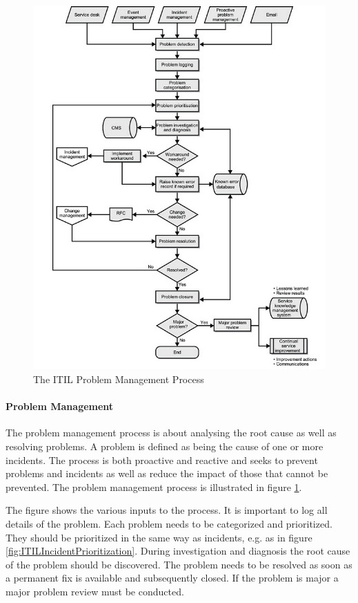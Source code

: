 \begin{figure}[H]
\hspace{-1.2cm}\includegraphics[scale=0.72]{ITILProblemManagement.png}
\caption[The ITIL Problem Management Process]{The ITIL Problem Management Process \cite{itilbok}}
\label{fig:ITILProblemManagement}
\end{figure}

\paragraph{Problem Management}
The problem management process is about analysing the root cause as well as resolving problems. A problem is defined as being the cause of one or more incidents. The process is both proactive and reactive and seeks to prevent problems and incidents as well as reduce the impact of those that cannot be prevented. The problem management process is illustrated in figure \ref{fig:ITILProblemManagement}. 

The figure shows the various inputs to the process. It is important to log all details of the problem. Each problem needs to be categorized and prioritized. They should be prioritized in the same way as incidents, e.g. as in figure \ref{fig:ITILIncidentPrioritization}. During investigation and diagnosis the root cause of the problem should be discovered. The problem needs to be resolved as soon as a permanent fix is available and subsequently closed. If the problem is major a major problem review must be conducted.

